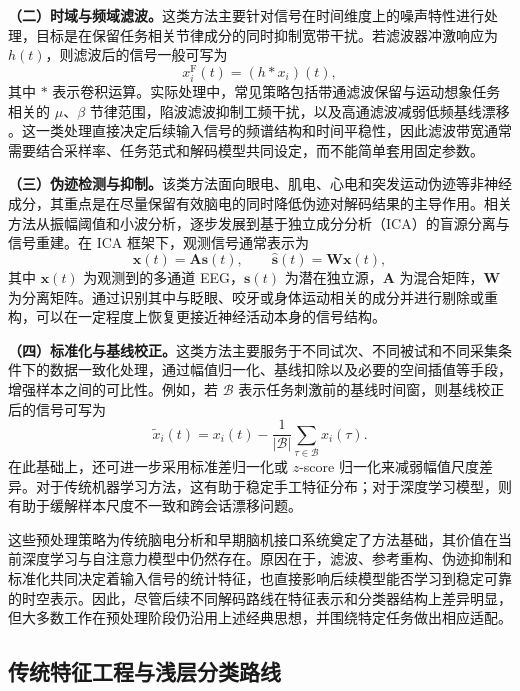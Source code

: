 \textbf{（二）时域与频域滤波。}这类方法主要针对信号在时间维度上的噪声特性进行处理，目标是在保留任务相关节律成分的同时抑制宽带干扰。若滤波器冲激响应为 $h(t)$，则滤波后的信号一般可写为
\begin{equation}
x_i^{\mathrm{F}}(t)=(h*x_i)(t),
\end{equation}
其中 $*$ 表示卷积运算。实际处理中，常见策略包括带通滤波保留与运动想象任务相关的 $\mu$、$\beta$ 节律范围，陷波滤波抑制工频干扰，以及高通滤波减弱低频基线漂移 \cite{picton2000guidelines}。这一类处理直接决定后续输入信号的频谱结构和时间平稳性，因此滤波带宽通常需要结合采样率、任务范式和解码模型共同设定，而不能简单套用固定参数。

\textbf{（三）伪迹检测与抑制。}该类方法面向眼电、肌电、心电和突发运动伪迹等非神经成分，其重点是在尽量保留有效脑电的同时降低伪迹对解码结果的主导作用。相关方法从振幅阈值和小波分析，逐步发展到基于独立成分分析（ICA）的盲源分离与信号重建\cite{sweeney2012artifact, albera2012ica}。在 ICA 框架下，观测信号通常表示为
\begin{equation}
\mathbf{x}(t)=\mathbf{A}\mathbf{s}(t), \qquad \hat{\mathbf{s}}(t)=\mathbf{W}\mathbf{x}(t),
\end{equation}
其中 $\mathbf{x}(t)$ 为观测到的多通道 EEG，$\mathbf{s}(t)$ 为潜在独立源，$\mathbf{A}$ 为混合矩阵，$\mathbf{W}$ 为分离矩阵。通过识别其中与眨眼、咬牙或身体运动相关的成分并进行剔除或重构，可以在一定程度上恢复更接近神经活动本身的信号结构。

\textbf{（四）标准化与基线校正。}这类方法主要服务于不同试次、不同被试和不同采集条件下的数据一致化处理，通过幅值归一化、基线扣除以及必要的空间插值等手段，增强样本之间的可比性\cite{lotte2018review}。例如，若 $\mathcal{B}$ 表示任务刺激前的基线时间窗，则基线校正后的信号可写为
\begin{equation}
\tilde{x}_i(t)=x_i(t)-\frac{1}{|\mathcal{B}|}\sum_{\tau \in \mathcal{B}}x_i(\tau).
\end{equation}
在此基础上，还可进一步采用标准差归一化或 $z$-score 归一化来减弱幅值尺度差异。对于传统机器学习方法，这有助于稳定手工特征分布；对于深度学习模型，则有助于缓解样本尺度不一致和跨会话漂移问题。

这些预处理策略为传统脑电分析和早期脑机接口系统奠定了方法基础，其价值在当前深度学习与自注意力模型中仍然存在。原因在于，滤波、参考重构、伪迹抑制和标准化共同决定着输入信号的统计特征，也直接影响后续模型能否学习到稳定可靠的时空表示。因此，尽管后续不同解码路线在特征表示和分类器结构上差异明显，但大多数工作在预处理阶段仍沿用上述经典思想，并围绕特定任务做出相应适配。

\subsection{传统特征工程与浅层分类路线}

